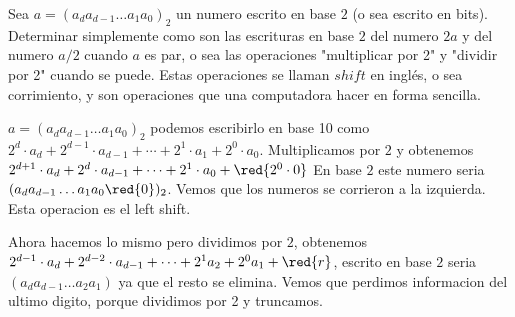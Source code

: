 \begin{enunciado}{\ejercicio}
Sea $a = (a_d a_{d-1} \ldots a_1 a_0)_2$ un numero escrito en base $2$ (o sea escrito en bits). Determinar 
simplemente como son las escrituras en base $2$ del numero $2a$ y del numero $a/2$ cuando $a$ es par, o sea 
las operaciones "multiplicar por 2" y "dividir por 2" cuando se puede. Estas operaciones se llaman $shift$ en inglés,
o sea corrimiento, y son operaciones que una computadora hacer en forma sencilla. 

\end{enunciado}

$a = (a_d a_{d-1} \ldots a_1 a_0)_2$ podemos escribirlo en base 10 como
$2^d \cdot a_d + 2^{d-1} \cdot a_{d-1} + \cdots + 2^1 \cdot a_1 + 2^0 \cdot a_0$. 
Multiplicamos por $2$ y obtenemos $2^{d + 1} \cdot a_d + 2^d \cdot a_{d-1} + \cdots + 2^1 \cdot a_0 + \red{2^0 \cdot 0}$
En base $2$ este numero seria $(a_d a_{d-1} \ldots a_1 a_0 \red{0})_2$. Vemos que los numeros se corrieron a la izquierda. 
Esta operacion es el left shift. 

Ahora hacemos lo mismo pero dividimos por $2$, obtenemos 
$2^{d - 1} \cdot a_d + 2^{d - 2} \cdot a_{d-1} + \cdots + 2^1 a_2 + 2^0 a_1 + \red{r}$, escrito en base $2$ seria 
$(a_{d} a_{d-1} \ldots a_2 a_1)$ ya que el resto se elimina. Vemos que perdimos informacion del ultimo digito, porque dividimos por 2 y truncamos.

\begin{aportes}
 \item {}
\end{aportes}
